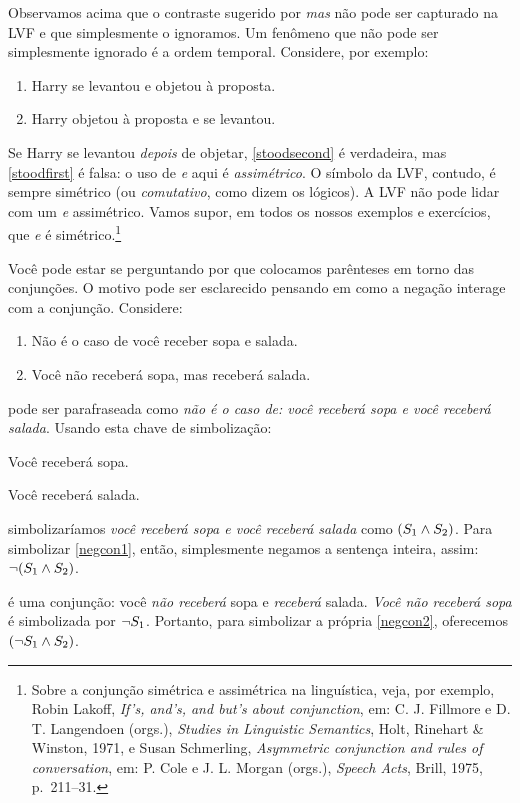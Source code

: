 Observamos acima que o contraste sugerido por \emph{mas} não pode ser
capturado na LVF e que simplesmente o ignoramos. Um fenômeno que não
pode ser simplesmente ignorado é a ordem temporal. Considere, por
exemplo:
\begin{enumerate}
	\item\label{stoodfirst} Harry se levantou e objetou à proposta.
	\item\label{stoodsecond} Harry objetou à proposta e se levantou.
\end{enumerate}
Se Harry se levantou \emph{depois} de objetar, \cref*{stoodsecond} é
verdadeira, mas \cref*{stoodfirst} é falsa: o uso de \emph{e} aqui é
\emph{assimétrico}. O símbolo \eand da LVF, contudo, é sempre simétrico
(ou \emph{comutativo}, como dizem os lógicos). A LVF não pode lidar com um
\emph{e} assimétrico. Vamos supor, em todos os nossos exemplos e
exercícios, que \emph{e} é simétrico.\footnote{Sobre a conjunção
simétrica e assimétrica na linguística, veja, por exemplo, Robin Lakoff,
\textit{If's, and's, and but's about conjunction}, em: C. J. Fillmore e
D. T. Langendoen (orgs.), \textit{Studies in Linguistic Semantics},
Holt, Rinehart \& Winston, 1971, e Susan Schmerling, \textit{Asymmetric
conjunction and rules of conversation}, em: P. Cole e J. L. Morgan
(orgs.), \textit{Speech Acts}, Brill, 1975, p.~211--31.}

Você pode estar se perguntando por que colocamos parênteses em torno das
conjunções. O motivo pode ser esclarecido pensando em como a negação
interage com a conjunção. Considere:
	\begin{enumerate}
		\item\label{negcon1}Não é o caso de você receber sopa e salada.
		\item\label{negcon2}Você não receberá sopa, mas receberá salada.
	\end{enumerate}
 pode ser parafraseada como \emph{não é o caso de: você
receberá sopa e você receberá salada}. Usando esta chave de simbolização:
	\begin{ekey}
		\item[\ensuremath{S_1}] Você receberá sopa.
		\item[\ensuremath{S_2}] Você receberá salada.
	\end{ekey}
simbolizaríamos \emph{você receberá sopa e você receberá salada} como
$(S_1 \wedge S_2)$. Para simbolizar \cref*{negcon1}, então, simplesmente
negamos a sentença inteira, assim: $\neg (S_1 \wedge S_2)$.

 é uma conjunção: você \emph{não receberá} sopa e
\emph{receberá} salada. \emph{Você não receberá sopa} é simbolizada por
$\neg S_1$. Portanto, para simbolizar a própria \cref*{negcon2},
oferecemos $(\neg S_1 \wedge S_2)$.

